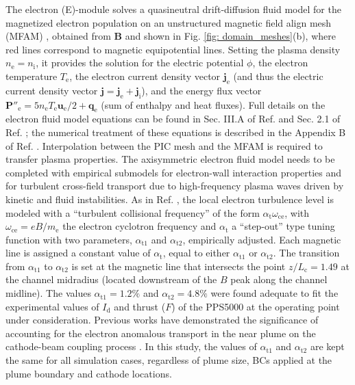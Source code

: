 \documentclass[%
 aip,
cha,
 amsmath,amssymb,
 reprint,%
]{revtex4-1}
\begin{document}
The electron (E)-module solves a quasineutral drift-diffusion fluid model for the magnetized electron population on an unstructured magnetic field align mesh (MFAM) \cite{pere16}, obtained from $\bm B$ and shown in Fig. \ref{fig: domain_meshes}(b), where red lines correspond to magnetic equipotential lines.
%
Setting the plasma density $n_\mathrm{e}=n_\mathrm{i}$, it provides the solution for the electric potential $\phi$, the electron temperature $T_\mathrm{e}$, the electron current density vector $\bm{j}_\mathrm{e}$ (and thus the electric current density vector $\bm j = \bm j_\mathrm{e} + \bm j_\mathrm{i}$), and the energy flux vector $\bm{P}''_\mathrm{e} = 5n_\mathrm{e}T_\mathrm{e}\bm{u}_\mathrm{e}/2 + \bm{q}_\mathrm{e}$ (sum of enthalpy and heat fluxes). Full details on the electron fluid model equations can be found in Sec. III.A of Ref.  and Sec. 2.1 of Ref. ; the numerical treatment of these equations is described in the Appendix B of Ref. . Interpolation between the PIC mesh and the MFAM is required to transfer plasma properties.
%
The axisymmetric electron fluid model needs to be completed with empirical submodels for electron-wall interaction properties and for turbulent cross-field transport due to high-frequency plasma waves driven by kinetic and fluid instabilities. As in Ref. , the local electron turbulence level is modeled with a ``turbulent collisional frequency'' of the form  $\alpha_\mathrm{t}\omega_\mathrm{ce}$, with $\omega_\mathrm{ce} = eB/m_\mathrm{e}$ the electron cyclotron frequency and $\alpha_\mathrm{t}$ a ``step-out'' type tuning function with two parameters, $\alpha_\mathrm{t1}$ and $\alpha_\mathrm{t2}$,  empirically adjusted.
%
Each magnetic line is assigned a constant value of $\alpha_\mathrm{t}$, equal to either $\alpha_\mathrm{t1}$ or $\alpha_\mathrm{t2}$. The transition from $\alpha_\mathrm{t1}$ to $\alpha_\mathrm{t2}$ is set at the magnetic line that intersects the point $z/L_\mathrm{c} = 1.49$ at the channel midradius (located downstream of the $B$ peak along the channel midline).
%
The values $\alpha_\mathrm{t1} = 1.2\%$ and $\alpha_\mathrm{t2} = 4.8\%$ were found  adequate to fit the experimental values of $I_\mathrm{d}$ and thrust ($F$) of the PPS5000 at the operating point under consideration. 
%
Previous works have demonstrated the significance of accounting for the electron anomalous transport in the near plume on the cathode-beam coupling process \cite{orte16}. In this study, the values of $\alpha_\mathrm{t1}$ and $\alpha_\mathrm{t2}$ are kept the same for all simulation cases, regardless of plume size, BCs applied at the plume boundary and cathode locations.
\end{document}
